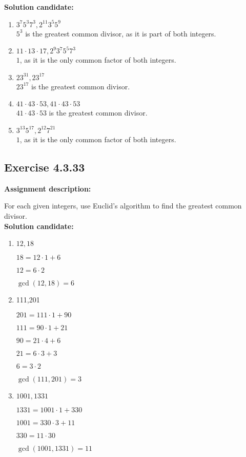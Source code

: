 \documentclass{report}
\newcommand{\cent}[1]{\begin{center}#1\end{center}}
\newcommand{\assignmentDescription}{\textbf{Assignment description: }}
\newcommand{\solution}{\textbf{Solution candidate: }}
\newcommand{\Exercise}[1]{\subsection{Exercise #1}}
\newcommand{\defaultEnumerateLabel}{\textbf{\alph*.}}
\newcommand{\myItem}[1]{\item #1\\}
\begin{document}
\begin{enumerate}[label=\defaultEnumerateLabel]
	\solution
	
	\begin{enumerate}[label=\defaultEnumerateLabel]
		\myItem{$3^7 5^3 7^3, 2^{11} 3^5 5^9$}
		
		$5^3$ is the greatest common divisor, as it is part of both integers.\\
		
		\myItem{$11 \cdot 13 \cdot 17, 2^9 3^7 5^5 7^3$}
		
		$1$, as it is the only common factor of both integers.\\
		
		\myItem{$23^{31}, 23^{17}$}
		
		$23^{17}$ is the greatest common divisor.\\
		
		\myItem{$41 \cdot 43 \cdot 53, 41 \cdot 43 \cdot 53$}
		
		$41 \cdot 43 \cdot 53$ is the greatest common divisor.\\
		
		\myItem{$3^{13} 5^{17} , 2^{12} 7^{21}$}
		
		$1$, as it is the only common factor of both integers.\\
	\end{enumerate}
	
	\Exercise{4.3.33}
	
	\assignmentDescription
	
	For each given integers, use Euclid's algorithm to find the greatest common divisor.\\
	
	\solution
	
	\begin{enumerate}[label=\defaultEnumerateLabel]
		\myItem{$12,18$}
		
		\cent{$18 = 12 \cdot 1 + 6$}
		\cent{$12 = 6 \cdot 2$}
		
		\cent{$\gcd(12,18) = 6$}
		
		\myItem{111,201}
		
		\cent{$201 = 111\cdot 1 + 90$}
		\cent{$111 = 90 \cdot 1 + 21$}
		\cent{$90 = 21 \cdot 4 + 6$}
		\cent{$21 = 6 \cdot 3 + 3$}
		\cent{$6 = 3 \cdot 2$}
		
		\cent{$\gcd(111,201) = 3$}
		
		\myItem{$1001,1331$}
		
		\cent{$1331 = 1001 \cdot 1 + 330$}
		\cent{$1001 = 330 \cdot 3 + 11$}
		\cent{$330 = 11 \cdot 30 $}
		
		\cent{$\gcd(1001,1331) = 11$}
		

\end{enumerate}
\end{enumerate}
\end{document}
